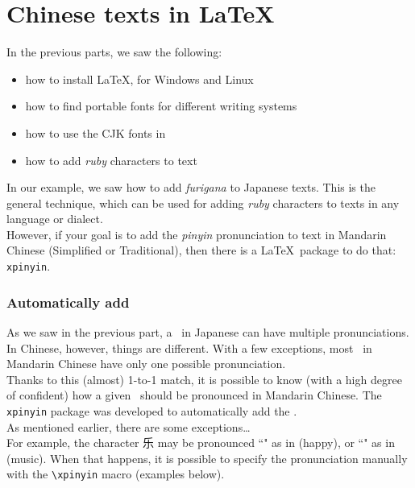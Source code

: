 
\part{Chinese texts in \LaTeX} \label{chinese}

\renewcommand{\currentPart}{Chinese texts in \LaTeX}



In the previous parts, we saw the following:

\begin{itemize}
	\item how to install \LaTeX, for Windows and Linux
	\item how to find portable fonts for different writing systems
	\item how to use the CJK fonts in \XeLaTeX
	\item how to add \emph{ruby} characters to text
\end{itemize}

In our example, we saw how to add \emph{furigana} to Japanese texts. This is the general technique, which can be used for adding \emph{ruby} characters to texts in any language or dialect. \\

However, if your goal is to add the \emph{pinyin} pronunciation to text in Mandarin Chinese (Simplified or Traditional), then there is a \LaTeX\ package to do that: \texttt{xpinyin}.



\section*{Automatically add \ppinyin}

As we saw in the previous part, a \kanji\ in Japanese can have multiple pronunciations.
In Chinese, however, things are different. With a few exceptions, most \kanji\ in Mandarin Chinese have only one possible pronunciation. \\

Thanks to this (almost) 1-to-1 match, it is possible to know (with a high degree of confident) how a given \kanji\ should be pronounced in Mandarin Chinese. The \texttt{xpinyin} package was developed to automatically add the \ppinyin. \\

As mentioned earlier, there are some exceptions\dots \\
For example, the character 乐 may be pronounced ``" as in  (happy), or ``" as in  (music). 
When that happens, it is possible to specify the pronunciation manually with the  \texttt{\textbackslash xpinyin} macro (examples below).


